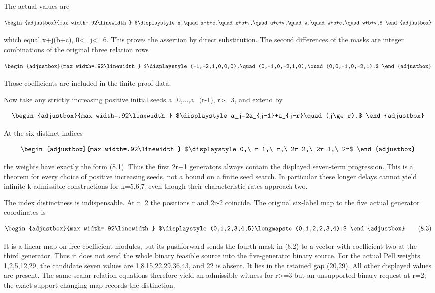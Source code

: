 The actual values are

\[
\begin{adjustbox}{max width=.92\linewidth}
$\displaystyle x,\quad x+b+c,\quad x+b+v,\quad u+c+v,\quad
 w,\quad w+b+c,\quad w+b+v,$
\end{adjustbox}
\]

which equal x+j(b+c), 0\textless=j\textless=6. This proves the assertion by direct substitution. The second differences of the masks are integer combinations of the original three relation rows

\[
\begin{adjustbox}{max width=.92\linewidth}
$\displaystyle (-1,-2,1,0,0,0),\quad(0,-1,0,-2,1,0),\quad(0,0,-1,0,-2,1).$
\end{adjustbox}
\]

Those coefficients are included in the finite proof data.

Now take any strictly increasing positive initial seeds a\_0,...,a\_(r-1), r\textgreater=3, and extend by

\[
\begin{adjustbox}{max width=.92\linewidth}
$\displaystyle a_j=2a_{j-1}+a_{j-r}\quad(j\ge r).$
\end{adjustbox}
\]

At the six distinct indices

\[
\begin{adjustbox}{max width=.92\linewidth}
$\displaystyle 0,\ r-1,\ r,\ 2r-2,\ 2r-1,\ 2r$
\end{adjustbox}
\]

the weights have exactly the form (8.1). Thus the first 2r+1 generators always contain the displayed seven-term progression. This is a theorem for every choice of positive increasing seeds, not a bound on a finite seed search. In particular these longer delays cannot yield infinite k-admissible constructions for k=5,6,7, even though their characteristic rates approach two.

The index distinctness is indispensable. At r=2 the positions r and 2r-2 coincide. The original six-label map to the five actual generator coordinates is

\[
\begin{adjustbox}{max width=.92\linewidth}
$\displaystyle (0,1,2,3,4,5)\longmapsto(0,1,2,2,3,4).$
\end{adjustbox}
\tag{8.3}
\]

It is a linear map on free coefficient modules, but its pushforward sends the fourth mask in (8.2) to a vector with coefficient two at the third generator. Thus it does not send the whole binary feasible source into the five-generator binary source. For the actual Pell weights 1,2,5,12,29, the candidate seven values are 1,8,15,22,29,36,43, and 22 is absent. It lies in the retained gap (20,29). All other displayed values are present. The same scalar relation equations therefore yield an admissible witness for r\textgreater=3 but an unsupported binary request at r=2; the exact support-changing map records the distinction.

